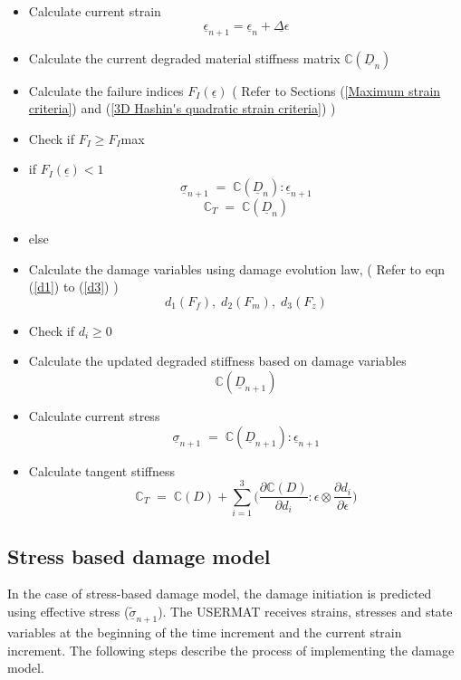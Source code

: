 \documentclass[12pt]{report}
\begin{document}
\begin{itemize}
\item Calculate current strain \textbf{$$ \underline{\epsilon}_{n+1} = \underline{\epsilon}_{n} + \underline{\Delta \epsilon} $$}
\item Calculate the current degraded material stiffness matrix  \textbf{$\mathbb{C}(\underline{D}_{n})$}
\item Calculate the failure indices \textbf{$F_{I}(\underline{\epsilon})$} \;\; ( Refer to Sections (\ref{Maximum strain criteria}) and (\ref{3D Hashin's quadratic strain criteria}) )
\item[] Check if $F_{I} \geq F_{I}$max
\item if \textbf{$F_{I}(\underline{\epsilon})<1$} \textbf{$$\underline{\sigma}_{n+1} \; = \; \mathbb{C}(\underline{D}_{n}) :  \underline{\epsilon}_{n+1} $$} \textbf{$$\mathbb{C}_{T} \; = \; \mathbb{C}(\underline{D}_{n})$$}
\item else
\item[]  Calculate the damage variables using damage evolution law, \;\; ( Refer to eqn (\ref{d1}) to (\ref{d3}) ) \textbf{$$d_{1}(F_{f}),\;d_{2}(F_{m}),\;d_{3}(F_{z})$$}
\item[]  Check if $d_{i} \geq 0 $ 
\item[]  Calculate the updated degraded stiffness based on damage variables \textbf{$$\mathbb{C}(\underline{D}_{n+1})$$}
\item[]  Calculate current stress  \textbf{$$\underline{\sigma}_{n+1} \; = \; \mathbb{C}(\underline{D}_{n+1}) :  \underline{\epsilon}_{n+1} $$}
\item[] Calculate tangent stiffness \textbf{$$\mathbb{C}_{T}  \; = \;\mathbb{C}(D) + \sum_{i = 1}^{3} \Big( \frac{\partial \mathbb{C}(D) }{\partial d_{i}} : \epsilon \otimes \frac{\partial d_{i}}{\partial \epsilon }\Big)$$}
	
\end{itemize} 


\subsection{Stress based damage model}
\indent\indent\indent  In the case of stress-based damage model, the damage initiation is predicted using effective stress ($\underline{\tilde{\sigma}}_{n+1}$).  The USERMAT receives strains, stresses and state variables at the beginning of the time increment and the current strain increment. The following steps describe the process of implementing the damage model.
\end{document}
